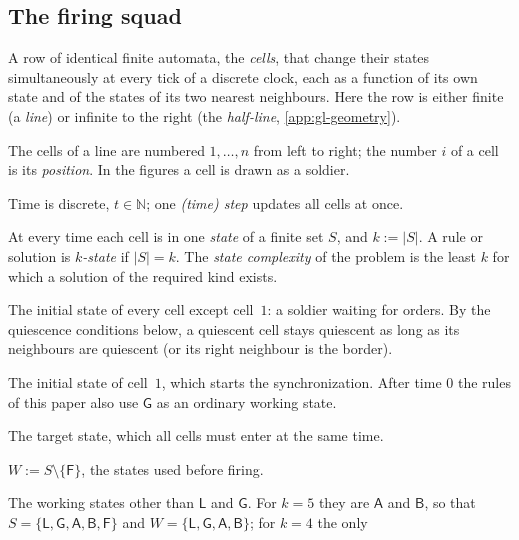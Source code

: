 {\subsection{The firing squad}\label{app:gl-squad}
\begin{description}[style=unboxed,leftmargin=1em,font=\normalfont\bfseries,itemsep=1pt,parsep=0pt,topsep=2pt]
\item[Cellular automaton (CA).] A row of identical finite automata,
  the \emph{cells}, that change their states simultaneously at every
  tick of a discrete clock, each as a function of its own state and of
  the states of its two nearest neighbours. Here the row is either
  finite (a \emph{line}) or infinite to the right (the \emph{half-line},
  \cref{app:gl-geometry}).
\item[Cell; position.] The cells of a line are numbered $1,\dots,n$
  from left to right; the number $i$ of a cell is its \emph{position}. In the figures a cell is drawn as a soldier.
\item[Time; step.] Time is discrete, $t\in\mathbb N$; one
  \emph{(time) step} updates all cells at once.
\item[State; state set $S$; number of states $k$.] At every time each
  cell is in one \emph{state} of a finite set $S$, and $k:=|S|$. A rule or
  solution is \emph{$k$-state} if $|S|=k$. The \emph{state complexity} of
  the problem is the least $k$ for which a solution of the required kind
  exists.
\item[Quiescent state $\mathsf L$.] The initial state of every cell
  except cell~$1$: a soldier waiting for orders. By the quiescence
  conditions below, a quiescent cell stays quiescent as long as its
  neighbours are quiescent (or its right neighbour is the border).
\item[General $\mathsf G$.] The initial state of cell~$1$, which starts
  the synchronization. After time $0$ the rules of this paper also use
  $\mathsf G$ as an ordinary working state.
\item[Firing state $\mathsf F$.] The target state, which all cells must
  enter at the same time.
\item[Working states $W$.] $W:=S\setminus\{\mathsf F\}$, the states used
  before firing.
\item[Auxiliary states.] The working states other than $\mathsf L$ and
  $\mathsf G$. For $k=5$ they are $\mathsf A$ and $\mathsf B$, so that
  $S=\{\mathsf L,\mathsf G,\mathsf A,\mathsf B,\mathsf F\}$ and
  $W=\{\mathsf L,\mathsf G,\mathsf A,\mathsf B\}$; for $k=4$ the only

\end{description}}
